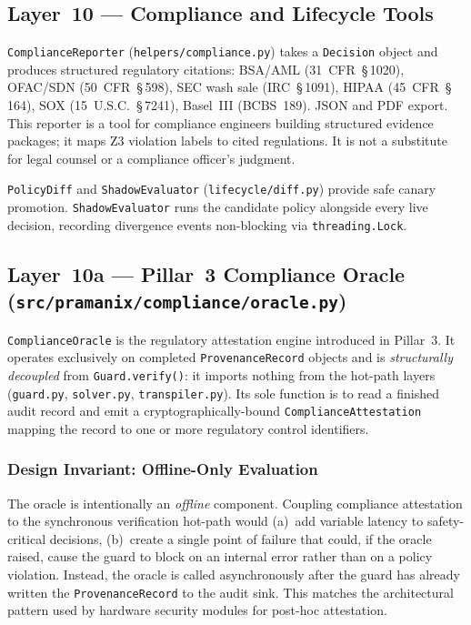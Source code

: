 \documentclass[12pt,a4paper,oneside]{report}
\newcommand{\fname}[1]{\texttt{#1}}          %
\newcommand{\code}[1]{\texttt{#1}}           %
\begin{document}
\subsection{Layer~10 --- Compliance and Lifecycle Tools}

\code{ComplianceReporter} (\fname{helpers/compliance.py}) takes a
\code{Decision} object and produces structured regulatory citations: BSA/AML
(31~CFR~\S\,1020), OFAC/SDN (50~CFR~\S\,598), SEC wash sale (IRC~\S\,1091),
HIPAA (45~CFR~\S\,164), SOX (15~U.S.C.~\S\,7241), Basel~III (BCBS~189). JSON
and PDF export.  This reporter is a tool for compliance engineers building
structured evidence packages; it maps Z3 violation labels to cited regulations.
It is not a substitute for legal counsel or a compliance officer's judgment.

\code{PolicyDiff} and \code{ShadowEvaluator} (\fname{lifecycle/diff.py})
provide safe canary promotion. \code{ShadowEvaluator} runs the candidate
policy alongside every live decision, recording divergence events non-blocking
via \code{threading.Lock}.

\subsection{Layer~10a --- Pillar~3 Compliance Oracle
  (\fname{src/pramanix/compliance/oracle.py})}

\code{ComplianceOracle} is the regulatory attestation engine introduced in
Pillar~3.  It operates exclusively on completed \code{ProvenanceRecord}
objects and is \emph{structurally decoupled} from \code{Guard.verify()}: it
imports nothing from the hot-path layers (\fname{guard.py},
\fname{solver.py}, \fname{transpiler.py}).  Its sole function is to read a
finished audit record and emit a cryptographically-bound
\code{ComplianceAttestation} mapping the record to one or more regulatory
control identifiers.

\subsubsection{Design Invariant: Offline-Only Evaluation}

The oracle is intentionally an \emph{offline} component.  Coupling compliance
attestation to the synchronous verification hot-path would (a)~add variable
latency to safety-critical decisions, (b)~create a single point of failure
that could, if the oracle raised, cause the guard to block on an internal
error rather than on a policy violation.  Instead, the oracle is called
asynchronously after the guard has already written the \code{ProvenanceRecord}
to the audit sink.  This matches the architectural pattern used by hardware
security modules for post-hoc attestation.
\end{document}
